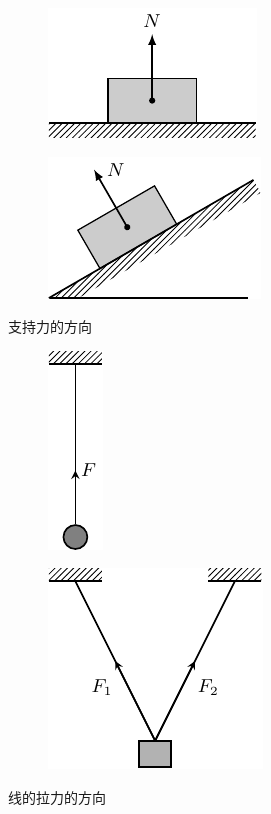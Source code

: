 \begin{figure}[htbp]\centering
    \begin{subfigure} {0.46\linewidth} 
        \centering
        \includegraphics{fig/A/1-8a.pdf} 
        \caption{} \label{fig_A_1-8a} 
    \end{subfigure} 
    \hfil
    \begin{subfigure} {0.46\linewidth} 
        \centering
        \includegraphics{fig/A/1-8b.pdf} 
        \caption{} \label{fig_A_1-8b} 
    \end{subfigure} 
    \caption{支持力的方向} \label{fig_A_1-8} 
\end{figure} 

\begin{figure}[htbp]
    \centering
    \begin{subfigure} {0.46\linewidth} 
        \centering
        \includegraphics{fig/A/1-9a.pdf} 
        \caption{} \label{fig_A_1-9a} 
    \end{subfigure} 
    \hfil
    \begin{subfigure} {0.46\linewidth} 
        \centering
        \includegraphics{fig/A/1-9b.pdf} 
        \caption{} \label{fig_A_1-9b} 
    \end{subfigure} 
    \caption{线的拉力的方向} \label{fig_A_1-9} 
\end{figure} 

